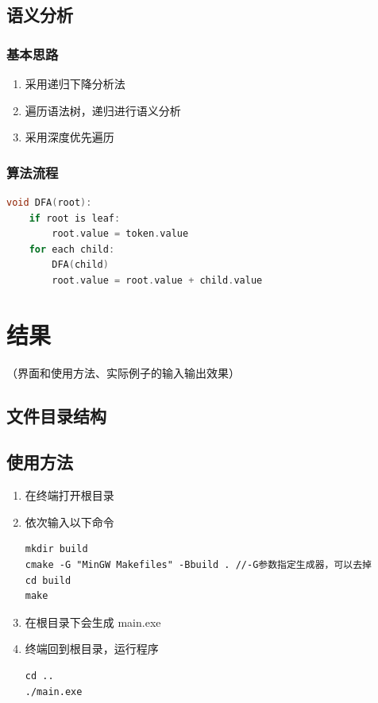 \documentclass[cs4size,a4paper]{ctexart}
\begin{document}
\subsection{语义分析}
\subsubsection{基本思路}
\begin{enumerate}
    \item 采用递归下降分析法
    \item 遍历语法树，递归进行语义分析
    \item 采用深度优先遍历
\end{enumerate}
\subsubsection{算法流程}
\begin{lstlisting}[language=c++]
void DFA(root):
    if root is leaf:
        root.value = token.value
    for each child:
        DFA(child)
        root.value = root.value + child.value
\end{lstlisting} 
\section{结果}（界面和使用方法、实际例子的输入输出效果）
\subsection{文件目录结构}



\subsection{使用方法}
\begin{enumerate}
    \item 在终端打开根目录
    \item 依次输入以下命令
            \begin{lstlisting}
mkdir build
cmake -G "MinGW Makefiles" -Bbuild . //-G参数指定生成器，可以去掉
cd build
make
            \end{lstlisting}
    \item 在根目录下会生成 main.exe
    \item 终端回到根目录，运行程序
        \begin{lstlisting}
cd ..
./main.exe
        \end{lstlisting}
\end{enumerate}
\end{document}
